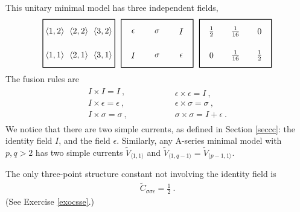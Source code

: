 \documentclass[12pt,a4paper,notitlepage]{report}
\numberwithin{equation}{section}
\theoremstyle{break}
\begin{document}
This unitary minimal model has three independent fields, 
\begin{align}
 \begin{tikzpicture}[scale = .5, baseline=(current  bounding  box.center)]
  \draw[thick] (-1,-1) -- (-1, 3) -- (5, 3) -- (5, -1) -- cycle;
  \foreach \x in {1, ..., 3}{
  \foreach \y in {1, 2}{
  \node at ({2*(\x-1)}, {2*(\y-1)}) {$\langle \x,\y\rangle $};
  }}
 \end{tikzpicture}
 \ \ 
 \begin{tikzpicture}[scale = .5, baseline=(current  bounding  box.center)]
  \draw[thick] (-1,-1) -- (-1, 3) -- (5, 3) -- (5, -1) -- cycle;
  \node at (0, 0) {$I$};
  \node at (2, 0) {$\sigma$};
  \node at (4, 0) {$\epsilon$};
  \node at (0, 2) {$\epsilon$};
  \node at (2, 2) {$\sigma$};
  \node at (4, 2) {$I$};
 \end{tikzpicture}
 \ \ 
 \begin{tikzpicture}[scale = .5, baseline=(current  bounding  box.center)]
  \draw[thick] (-1,-1) -- (-1, 3) -- (5, 3) -- (5, -1) -- cycle;
  \node at (0, 0) {$0$};
  \node at (2, 0) {$\frac{1}{16}$};
  \node at (4, 0) {$\frac12$};
  \node at (0, 2) {$\frac12$};
  \node at (2, 2) {$\frac{1}{16}$};
  \node at (4, 2) {$0$};
 \end{tikzpicture}
\end{align}
The fusion rules are 
\begin{align}
\begin{array}{l}
 I\times I = I \ ,
\\ I\times \epsilon = \epsilon\ ,
\\ I\times \sigma = \sigma\ ,
\end{array}
\hspace{2cm}
\begin{array}{l}
 \epsilon\times \epsilon = I\ ,
\\ \epsilon\times \sigma = \sigma\ ,
\\ \sigma \times \sigma = I + \epsilon\ .
\end{array}
\end{align}
We notice that there are two simple currents, as defined in Section \ref{seccc}: the identity field $I$, and the field $\epsilon$.
Similarly, any A-series minimal model with $p,q>2$ has two simple currents $\tilde{V}_{\langle 1,1 \rangle}$ and $\tilde{V}_{\langle 1,q-1 \rangle}=\tilde{V}_{\langle p-1,1 \rangle}$. 

The only three-point structure constant not involving the identity field is 
\begin{align}
 \tilde{C}_{\sigma\sigma\epsilon} =\frac12\ .
\label{csse}
\end{align}
(See Exercise \ref{exocsse}.)
\end{document}
